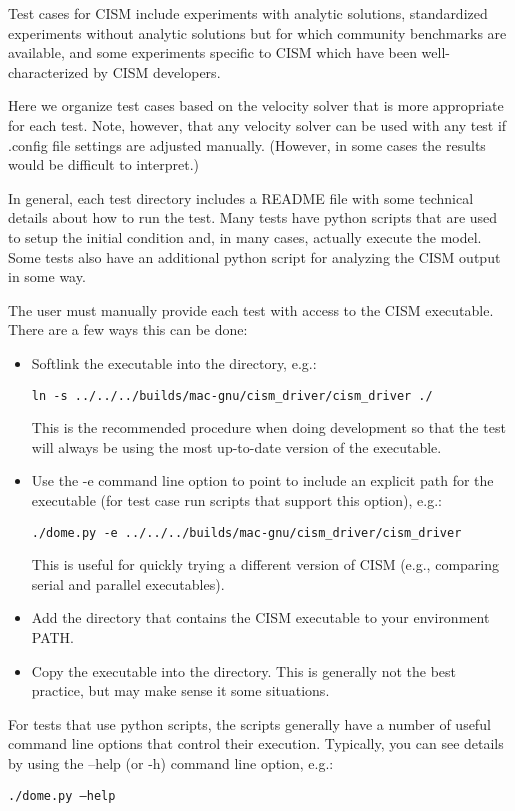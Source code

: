 
\label{ch:tests}

Test cases for CISM include experiments with analytic solutions, standardized experiments
without analytic solutions but for which community benchmarks are available, and
some experiments specific to CISM which have been well-characterized by CISM developers.

Here we organize test cases based on the velocity solver that is more appropriate
for each test.  Note, however, that any velocity solver can be used with any test
if .config file settings are adjusted manually.  (However, in some cases the results
would be difficult to interpret.)

In general, each test directory includes a README file with some technical details 
about how to run the test.  Many tests have python scripts that are used to setup
the initial condition and, in many cases, actually execute the model.  Some tests
also have an additional python script for analyzing the CISM output in some way.

The user must manually provide each test with access to the CISM executable.
There are a few ways this can be done:

\begin{itemize}
  \item Softlink the executable into the directory, e.g.:

        \texttt{ln -s ../../../builds/mac-gnu/cism\_driver/cism\_driver ./}

        This is the recommended procedure when doing development so that the test
        will always be using the most up-to-date version of the executable.

  \item Use the -e command line option to point to include an explicit path for the executable (for test case run scripts that support this option), e.g.:

        \texttt{./dome.py -e ../../../builds/mac-gnu/cism\_driver/cism\_driver}

        This is useful for quickly trying a different version of CISM (e.g., comparing 
        serial and parallel executables).

  \item Add the directory that contains the CISM executable to your environment PATH.

  \item Copy the executable into the directory.  This is generally not the best practice,
        but may make sense it some situations.
\end{itemize}

For tests that use python scripts, the scripts generally have a number of useful
command line options that control their execution.  Typically, you can see details 
by using the --help (or -h) command line option, e.g.:

\texttt{./dome.py --help}







